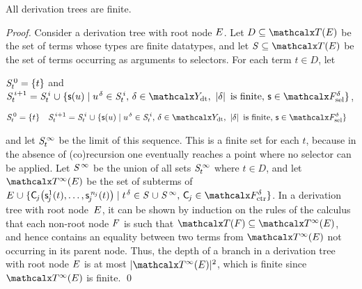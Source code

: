 \begin{theorem}[Termination]%
\label{thm:t}%
\afterDot
All derivation trees are finite.
\end{theorem}
\begin{proof}
Consider a derivation tree with root node $E$. Let $D \subseteq \tEc$ be the
set of terms whose types are finite datatypes, and let $\SSS \subseteq \tEc$ be
the set of terms occurring as arguments to selectors. For each term $t \in
D$\negvthinspace, let
\begin{conf}
$\smash{\mathit{S}^{\,0}_t} = \{ t \}$ and
$\smash{\SSSS {i+1}_t} = \smash{\SSSS i_t \mathrel\cup \{ \const s( u ) \mid u\typ{\delta} \in \SSSS i_t{,}}~\allowbreak\smash{ \delta \in \Data{,}~ \left|\delta\right| \text{ is finite}{,}~ \const{s} \in \Sel^{\delta}}  \}$,
\end{conf}%
\begin{rep}
\begin{align*}
\smash{\SSSS 0_t} & = \{ t \}
& \smash{\SSSS {i+1}_t} & = \smash{\SSSS i_t \mathrel\cup \{ \const s( u ) \mid u\typ{\delta} \in \SSSS i_t{,}~ \delta \in \Data{,}~ \left|\delta\right| \text{ is finite}{,}~ \const{s} \in \Sel^{\delta}}  \}
\end{align*}
\end{rep}%
and let $\mathit{S}^{\,\infty}_t$ be the limit of this sequence.
This is a finite set for each $t$, because in the absence of (co)recursion
one eventually reaches a point where no selector can be applied.
Let $\mathit{S}^{\,\infty}$ be the union of all sets $\mathit{S}^{\,\infty}_t$ where $t \in D$,
and let $\tcEc$ be the set of subterms of
%
$\Ec \mathrel\cup \{ \const C_{\negvthinspace j}\bigl( \const s^1_{\negvthinspace j}( t ), \ldots, \const s^{\smash{\,n_{\negvthinspace j}}}_{\negvthinspace j}( t ) \bigr) \mid t\typ{\delta} \in \SSS \mathrel\cup \SSSS \AST{,}~ \const C_{\negvthinspace j} \in \Ctr^\delta \}$.
%
In a derivation tree with root node~$E$,
it can be shown by %
induction on the rules of the calculus that each non-root node $F$ is such that
$\Terms(\Fc) \subseteq \tcEc$, and hence contains an equality between two terms from $\tcEc$ not occurring in its parent node.
Thus, the depth of a branch in a derivation tree with root node $E$ is at most $\left| \smash{\tcEc}\vphantom{X} \right|{\!}^2$,
which is finite since $\tcEc$ is finite.
\qed
\end{proof}

